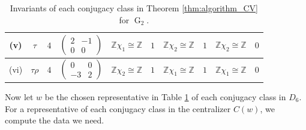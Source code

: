 \documentclass[11pt,english]{amsart}
\numberwithin{equation}{section}
\numberwithin{figure}{section}
\theoremstyle{plain}
\theoremstyle{plain}
\theoremstyle{definition}
\theoremstyle{remark}
\newcommand{\G}{\operatorname{G}}
\begin{document}
\begin{table}[H]
\begin{tabular}{|c|c|c|c|c|c|c|c|c|c|}
        (v) & $\tau$ & $4$ & $\begin{pmatrix} 2 & -1 \\ 0 & 0 \end{pmatrix}$ & $\mathbb{Z}\chi_1\cong \mathbb{Z}$& $1$ & $\mathbb{Z}\chi_2 \cong \mathbb{Z}$ & $1$ & $\mathbb{Z}\chi_2\cong \mathbb{Z}$ & $0$ \\\hline
        (vi) & $\tau\rho$ & $4$ & $\begin{pmatrix} 0 & 0 \\ -3 & 2 \end{pmatrix}$ & $\mathbb{Z}\chi_2\cong \mathbb{Z}$ & $1$ & $\mathbb{Z}\chi_1 \cong \mathbb{Z}$ & $1$ & $\mathbb{Z}\chi_1\cong \mathbb{Z}$ & $0$ \\\hline
    \end{tabular}
    \caption{Invariants of each conjugacy class in Theorem \ref{thm:algorithm_CV} for $\G_2$.}
    \label{tab:G2_main}
\end{table}
\vspace{-0.4cm}
Now let $w$ be the chosen representative in Table \ref{tab:G2_main} of each conjugacy class in $D_6$. For a representative of each conjugacy class in the centralizer $C(w)$, we compute the data we need. 
\end{document}
